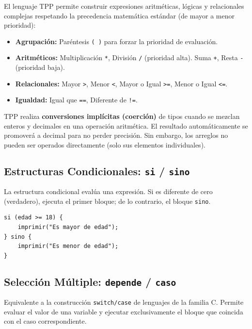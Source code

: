 El lenguaje TPP permite construir expresiones aritméticas, lógicas y relacionales complejas respetando la precedencia matemática estándar (de mayor a menor prioridad):

\begin{itemize}
    \item \textbf{Agrupación:} Paréntesis \texttt{( )} para forzar la prioridad de evaluación.
    \item \textbf{Aritméticos:} Multiplicación \texttt{*}, División \texttt{/} (prioridad alta). Suma \texttt{+}, Resta \texttt{-} (prioridad baja).
    \item \textbf{Relacionales:} Mayor \texttt{>}, Menor \texttt{<}, Mayor o Igual \texttt{>=}, Menor o Igual \texttt{<=}.
    \item \textbf{Igualdad:} Igual que \texttt{==}, Diferente de \texttt{!=}.
\end{itemize}

\begin{infobox}
TPP realiza \textbf{conversiones implícitas (coerción)} de tipos cuando se mezclan enteros y decimales en una operación aritmética. El resultado automáticamente se promoverá a decimal para no perder precisión. Sin embargo, los arreglos no pueden ser operados directamente (solo sus elementos individuales).
\end{infobox}

\subsection{Estructuras Condicionales: \texttt{si} / \texttt{sino}}

La estructura condicional evalúa una expresión. Si es diferente de cero (verdadero), ejecuta el primer bloque; de lo contrario, el bloque \texttt{sino}.

\begin{lstlisting}[style=tppstyle, caption={Uso de si y sino}]
si (edad >= 18) {
    imprimir("Es mayor de edad");
} sino {
    imprimir("Es menor de edad");
}
\end{lstlisting}

\subsection{Selección Múltiple: \texttt{depende} / \texttt{caso}}

Equivalente a la construcción \texttt{switch/case} de lenguajes de la familia C. Permite evaluar el valor de una variable y ejecutar exclusivamente el bloque que coincida con el caso correspondiente.

